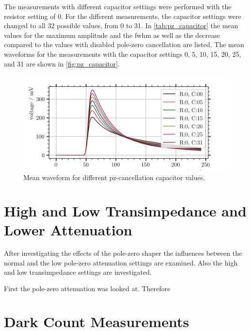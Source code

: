 The measurements with different capacitor settings were performed with the resistor setting of 0.
For the different measurements, the capacitor settings were changed to all 32 possible values, from 0 to 31.
In \autoref{tab:pz_capacitor} the mean values for the maximum amplitude and the \ac{fwhm} as well as the decrease compared to the values with disabled pole-zero cancellation are listed.
The mean waveforms for the measurements with the capacitor settings 0, 5, 10, 15, 20, 25, and 31 are shown in \autoref{fig:pz_capacitor}.
\begin{figure}
	\centering
	\includegraphics[width=1.\textwidth]{pictures/pz_capacitor.png}
	\caption[Mean waveform for different pz-cancellation capacitor values.]{Mean waveform for different pz-cancellation capacitor values.}
	\label{fig:pz_capacitor}
\end{figure}





\section{High and Low Transimpedance and Lower Attenuation}
After investigating the effects of the pole-zero shaper the influences between the normal and the low pole-zero attenuation settings are examined.
Also the high and low transimpedance settings are investigated.

First the pole-zero attenuation was looked at.
Therefore 



\section{Dark Count Measurements}


